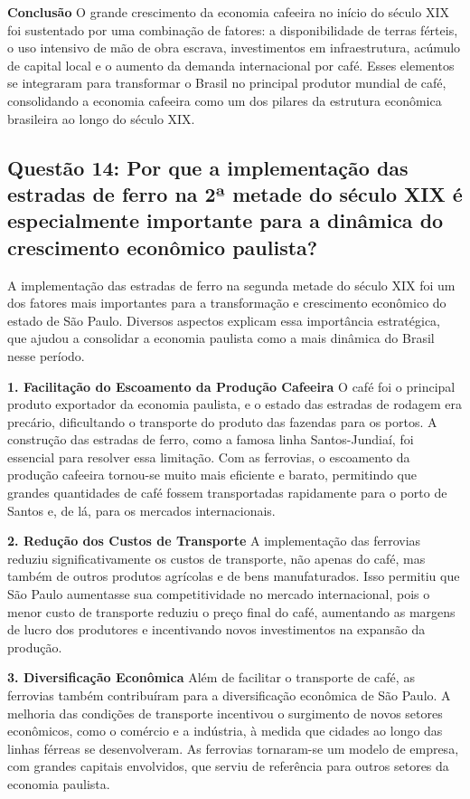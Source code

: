 \documentclass[a4paper,12pt]{article}[abntex2]
\begin{document}
\textbf{Conclusão}
O grande crescimento da economia cafeeira no início do século XIX foi sustentado por uma combinação de fatores: a disponibilidade de terras férteis, o uso intensivo de mão de obra escrava, investimentos em infraestrutura, acúmulo de capital local e o aumento da demanda internacional por café. Esses elementos se integraram para transformar o Brasil no principal produtor mundial de café, consolidando a economia cafeeira como um dos pilares da estrutura econômica brasileira ao longo do século XIX.

\subsection{\textbf{Questão 14: Por que a implementação das estradas de ferro na 2ª metade do século XIX é especialmente importante para a dinâmica do crescimento econômico paulista?}}

A implementação das estradas de ferro na segunda metade do século XIX foi um dos fatores mais importantes para a transformação e crescimento econômico do estado de São Paulo. Diversos aspectos explicam essa importância estratégica, que ajudou a consolidar a economia paulista como a mais dinâmica do Brasil nesse período.

\textbf{1. Facilitação do Escoamento da Produção Cafeeira}
O café foi o principal produto exportador da economia paulista, e o estado das estradas de rodagem era precário, dificultando o transporte do produto das fazendas para os portos. A construção das estradas de ferro, como a famosa linha Santos-Jundiaí, foi essencial para resolver essa limitação. Com as ferrovias, o escoamento da produção cafeeira tornou-se muito mais eficiente e barato, permitindo que grandes quantidades de café fossem transportadas rapidamente para o porto de Santos e, de lá, para os mercados internacionais.

\textbf{2. Redução dos Custos de Transporte}
A implementação das ferrovias reduziu significativamente os custos de transporte, não apenas do café, mas também de outros produtos agrícolas e de bens manufaturados. Isso permitiu que São Paulo aumentasse sua competitividade no mercado internacional, pois o menor custo de transporte reduziu o preço final do café, aumentando as margens de lucro dos produtores e incentivando novos investimentos na expansão da produção.

\textbf{3. Diversificação Econômica}
Além de facilitar o transporte de café, as ferrovias também contribuíram para a diversificação econômica de São Paulo. A melhoria das condições de transporte incentivou o surgimento de novos setores econômicos, como o comércio e a indústria, à medida que cidades ao longo das linhas férreas se desenvolveram. As ferrovias tornaram-se um modelo de empresa, com grandes capitais envolvidos, que serviu de referência para outros setores da economia paulista.
\end{document}
